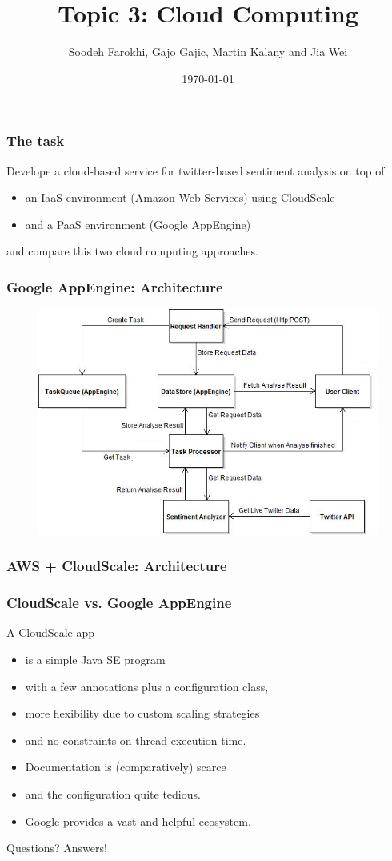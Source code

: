 \documentclass{beamer}
\title{Topic 3: Cloud Computing}
\author{Soodeh Farokhi, Gajo Gajic, Martin Kalany and Jia Wei}
\date{\today}
\newcommand\fG[1]{\textcolor{green!80!black}{#1}}
\newcommand\fR[1]{\textcolor{red!80!black}{#1}}
\begin{document}
\frame{\titlepage}

\begin{frame}
\frametitle{The task}

Develope a cloud-based service for twitter-based sentiment analysis on top of
\begin{itemize}
\item an IaaS environment (Amazon Web Services) using CloudScale
\item and a PaaS environment (Google AppEngine)
\end{itemize}

and compare this two cloud computing approaches.

\end{frame}


\begin{frame}
\frametitle{Google AppEngine: Architecture}
\begin{figure}
 \centerline{\includegraphics[width=1\columnwidth]{AppEngine.png}}
  \label{fig:appengine}
\end{figure}
\end{frame}
  
\begin{frame}
\frametitle{AWS + CloudScale: Architecture}
\end{frame}

\begin{frame}
\frametitle{CloudScale vs. Google AppEngine}
A CloudScale app
\begin{itemize}
\item is a \fG{simple Java SE program}
\item with \fG{a few annotations} plus a \fG{configuration} class,
\item more flexibility due to custom \fG{scaling} strategies
\item and \fG{no constraints on thread execution time}. 
\item \fR{Documentation} is (comparatively) \fR{scarce}
\item and the configuration quite \fR{tedious}.
\item \fR{Google} provides a \fR{vast and helpful ecosystem}.
\end{itemize}
\end{frame}

\begin{frame}
\fR{Questions?} \fG{Answers!}
\end{frame}
\end{document}
